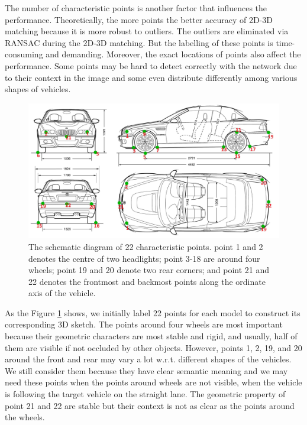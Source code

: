 \documentclass[a4paper,12pt]{article}
\begin{document}
The number of characteristic points is another factor that influences the performance. Theoretically, the more points the better accuracy of 2D-3D matching because it is more robust to outliers. The outliers are eliminated via RANSAC \cite{Fischler:1981:RSC:358669.358692} during the 2D-3D matching. But the labelling of these points is time-consuming and demanding. Moreover, the exact locations of points also affect the performance. Some points may be hard to detect correctly with the network due to their context in the image and some even distribute differently among various shapes of vehicles. 

\begin{figure}[ht]		
	\includegraphics[width=1\textwidth]{point_notation_22.jpg}
	\caption[The schematic diagram of 22 characteristic points.]{The schematic diagram of 22 characteristic points. point 1 and 2 denotes the centre of two headlights; point 3-18 are around four wheels; point 19 and 20 denote two rear corners; and point 21 and 22 denotes the frontmost and  backmost points along the ordinate axis of the vehicle.}
	\centering
	\label{figure:point_notation_22}
\end{figure}

As the Figure \ref{figure:point_notation_22} shows, we initially label 22 points for each model to construct its corresponding 3D sketch. The points around four wheels are most important because their geometric characters are most stable and rigid, and usually, half of them are visible if not occluded by other objects. However, points 1, 2, 19, and 20 around the front and rear may vary a lot w.r.t. different shapes of the vehicles. We still consider them because they have clear semantic meaning and we may need these points when the points around wheels are not visible, \eg when the vehicle is following the target vehicle on the straight lane. The geometric property of point 21 and 22 are stable but their context is not as clear as the points around the wheels.
\end{document}
